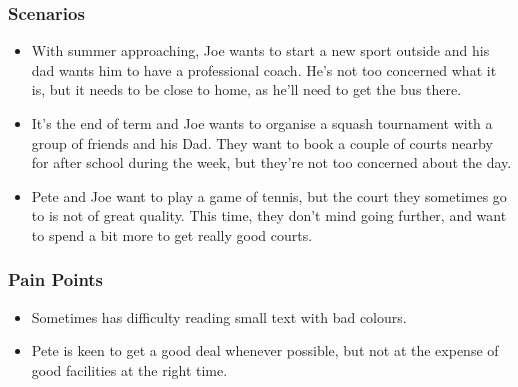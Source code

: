 
\subsubsection*{Scenarios}
\label{ssub:child_scenarios}

\begin{itemize}
	\item With summer approaching, Joe wants to start a new sport outside and
		his dad wants him to have a professional coach. He's not too concerned
		what it is, but it needs to be close to home, as he'll need to get the
		bus there.

	\item It's the end of term and Joe wants to organise a squash tournament
		with a group of friends and his Dad. They want to book a couple of
		courts nearby for after school during the week, but they're not too
		concerned about the day.

	\item Pete and Joe want to play a game of tennis, but the court they
		sometimes go to is not of great quality. This time, they don't mind
		going further, and want to spend a bit more to get really good courts.
\end{itemize}


\subsubsection*{Pain Points}
\label{ssub:child_pain_points}

\begin{itemize}
	\item Sometimes has difficulty reading small text with bad colours.
	\item Pete is keen to get a good deal whenever possible, but not at the
		expense of good facilities at the right time.
\end{itemize}

